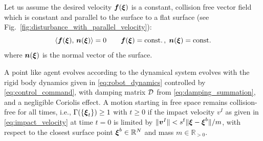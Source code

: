
Let us assume the desired velocity $\boldsymbol{f}(\boldsymbol{\xi})$ is a constant, collision free vector field which is constant and parallel to the surface to a flat surface (see Fig.~\ref{fig:disturbance_with_parallel_velocity}):
\begin{equation}
	\dotprod{\vect f(\vecs \xi)}{\vecs n(\vecs \xi)} = 0
	 \qquad
\vect f(\vecs \xi) = \text{const.}
\, , \;
\vect n(\vecs \xi) = \text{const.}
\label{eq:parallel_velocity}
\end{equation}
where $\boldsymbol{n}(\boldsymbol{\xi})$ is the normal vector of the surface. 

\begin{lemma} \label{lemma:damping_collision_avoidance}
	A point like agent evolves according to the dynamical system evolves with the rigid body dynamics given in \eqref{eq:robot_dynamics} controlled by \eqref{eq:control_command}, with damping matrix $\mathcal{D}$ from \eqref{eq:damping_summation}, and a negligible Coriolis effect.
	A motion starting in free space remains collision-free for all times, i.e., $\Gamma( \{\boldsymbol{\xi}_t\}) \geq 1$ with $t \geq 0$ if the impact velocity $v^I$ as given in \eqref{eq:impact_velocity} at time $t=0$ is limited by $\| \boldsymbol{v}^I\| < s^{\mathrm{f}} \| \boldsymbol{\xi} - \boldsymbol{\xi}^b \| / m$, with respect to the closest surface point $\boldsymbol{\xi}^b \in \mathbb{R}^N$ and mass $m \in \mathbb{R}_{>0}$.
\end{lemma}

